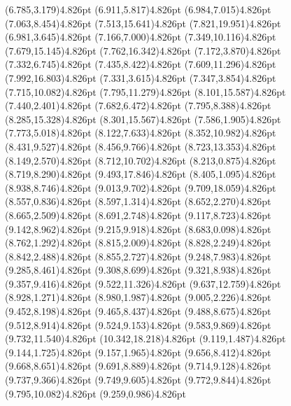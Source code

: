 \documentclass[10pt]{article}
\begin{document}
{{\qdisk(6.785,3.179){4.826pt}%
\qdisk(6.911,5.817){4.826pt}%
\qdisk(6.984,7.015){4.826pt}%
\qdisk(7.063,8.454){4.826pt}%
\qdisk(7.513,15.641){4.826pt}%
\qdisk(7.821,19.951){4.826pt}%
\qdisk(6.981,3.645){4.826pt}%
\qdisk(7.166,7.000){4.826pt}%
\qdisk(7.349,10.116){4.826pt}%
\qdisk(7.679,15.145){4.826pt}%
\qdisk(7.762,16.342){4.826pt}%
\qdisk(7.172,3.870){4.826pt}%
\qdisk(7.332,6.745){4.826pt}%
\qdisk(7.435,8.422){4.826pt}%
\qdisk(7.609,11.296){4.826pt}%
\qdisk(7.992,16.803){4.826pt}%
\qdisk(7.331,3.615){4.826pt}%
\qdisk(7.347,3.854){4.826pt}%
\qdisk(7.715,10.082){4.826pt}%
\qdisk(7.795,11.279){4.826pt}%
\qdisk(8.101,15.587){4.826pt}%
\qdisk(7.440,2.401){4.826pt}%
\qdisk(7.682,6.472){4.826pt}%
\qdisk(7.795,8.388){4.826pt}%
\qdisk(8.285,15.328){4.826pt}%
\qdisk(8.301,15.567){4.826pt}%
\qdisk(7.586,1.905){4.826pt}%
\qdisk(7.773,5.018){4.826pt}%
\qdisk(8.122,7.633){4.826pt}%
\qdisk(8.352,10.982){4.826pt}%
\qdisk(8.431,9.527){4.826pt}%
\qdisk(8.456,9.766){4.826pt}%
\qdisk(8.723,13.353){4.826pt}%
\qdisk(8.149,2.570){4.826pt}%
\qdisk(8.712,10.702){4.826pt}%
\qdisk(8.213,0.875){4.826pt}%
\qdisk(8.719,8.290){4.826pt}%
\qdisk(9.493,17.846){4.826pt}%
\qdisk(8.405,1.095){4.826pt}%
\qdisk(8.938,8.746){4.826pt}%
\qdisk(9.013,9.702){4.826pt}%
\qdisk(9.709,18.059){4.826pt}%
\qdisk(8.557,0.836){4.826pt}%
\qdisk(8.597,1.314){4.826pt}%
\qdisk(8.652,2.270){4.826pt}%
\qdisk(8.665,2.509){4.826pt}%
\qdisk(8.691,2.748){4.826pt}%
\qdisk(9.117,8.723){4.826pt}%
\qdisk(9.142,8.962){4.826pt}%
\qdisk(9.215,9.918){4.826pt}%
\qdisk(8.683,0.098){4.826pt}%
\qdisk(8.762,1.292){4.826pt}%
\qdisk(8.815,2.009){4.826pt}%
\qdisk(8.828,2.249){4.826pt}%
\qdisk(8.842,2.488){4.826pt}%
\qdisk(8.855,2.727){4.826pt}%
\qdisk(9.248,7.983){4.826pt}%
\qdisk(9.285,8.461){4.826pt}%
\qdisk(9.308,8.699){4.826pt}%
\qdisk(9.321,8.938){4.826pt}%
\qdisk(9.357,9.416){4.826pt}%
\qdisk(9.522,11.326){4.826pt}%
\qdisk(9.637,12.759){4.826pt}%
\qdisk(8.928,1.271){4.826pt}%
\qdisk(8.980,1.987){4.826pt}%
\qdisk(9.005,2.226){4.826pt}%
\qdisk(9.452,8.198){4.826pt}%
\qdisk(9.465,8.437){4.826pt}%
\qdisk(9.488,8.675){4.826pt}%
\qdisk(9.512,8.914){4.826pt}%
\qdisk(9.524,9.153){4.826pt}%
\qdisk(9.583,9.869){4.826pt}%
\qdisk(9.732,11.540){4.826pt}%
\qdisk(10.342,18.218){4.826pt}%
\qdisk(9.119,1.487){4.826pt}%
\qdisk(9.144,1.725){4.826pt}%
\qdisk(9.157,1.965){4.826pt}%
\qdisk(9.656,8.412){4.826pt}%
\qdisk(9.668,8.651){4.826pt}%
\qdisk(9.691,8.889){4.826pt}%
\qdisk(9.714,9.128){4.826pt}%
\qdisk(9.737,9.366){4.826pt}%
\qdisk(9.749,9.605){4.826pt}%
\qdisk(9.772,9.844){4.826pt}%
\qdisk(9.795,10.082){4.826pt}%
\qdisk(9.259,0.986){4.826pt}%
}}
\end{document}
